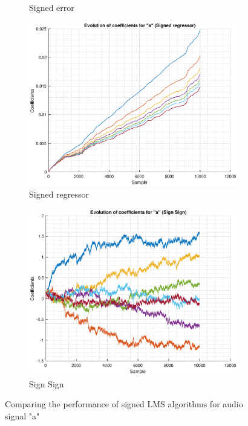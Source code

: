 \documentclass{article}
\begin{document}
\begin{figure}[h!]
\begin{subfigure}{0.24\textwidth}
\caption{Signed error}
\label{fig:salg_signerr_ar}
\end{subfigure}
\begin{subfigure}{0.24\textwidth}
\centering
\includegraphics[width = \textwidth]{salg_regressor_sp}
\caption{Signed regressor}
\label{fig:salg_regressor_sp}
\end{subfigure}
\begin{subfigure}{0.24\textwidth}
\centering
\includegraphics[width = \textwidth]{salg_signsign_sp}
\caption{Sign Sign}
\label{fig:salg_signsign_sp}
\end{subfigure}
\caption{Comparing the performance of signed LMS algorithms for audio signal "a"}
\label{fig:salg_sp}
\end{figure}
\end{document}
